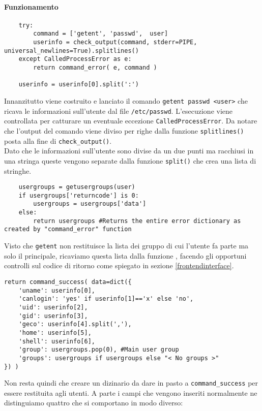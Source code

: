 \documentclass[11pt]{article}
\begin{document}
\paragraph{Funzionamento}
\begin{lstlisting}
    try:
        command = ['getent', 'passwd',  user]
        userinfo = check_output(command, stderr=PIPE, universal_newlines=True).splitlines()
    except CalledProcessError as e:
        return command_error( e, command )

	userinfo = userinfo[0].split(':')
\end{lstlisting}
Innanzitutto viene costruito e lanciato il comando \texttt{getent passwd <user>} che ricava le informazioni sull'utente dal file \texttt{/etc/passwd}.
L'esecuzione viene controllata per catturare un eventuale eccezione \texttt{CalledProcessError}. Da notare che l'output del comando viene diviso per righe
dalla funzione \texttt{splitlines()} posta alla fine di \texttt{check\_output()}.\\
Dato che le informazioni sull'utente sono divise da un due punti ma racchiusi in una stringa queste vengono separate dalla funzione \texttt{split()}
che crea una lista di stringhe.
\begin{lstlisting}
    usergroups = getusergroups(user)
    if usergroups['returncode'] is 0:
        usergroups = usergroups['data']
    else:
        return usergroups #Returns the entire error dictionary as created by "command_error" function
\end{lstlisting}
Visto che \texttt{getent} non restituisce la lista dei gruppo di cui l'utente fa parte ma solo il principale, ricaviamo questa lista
dalla funzione , facendo gli opportuni controlli sul codice di ritorno come spiegato in sezione \ref{frontendinterface}.
\begin{lstlisting}
return command_success( data=dict({
	'uname': userinfo[0],
	'canlogin': 'yes' if userinfo[1]=='x' else 'no',
	'uid': userinfo[2],
	'gid': userinfo[3],
	'geco': userinfo[4].split(','),
	'home': userinfo[5],
	'shell': userinfo[6],
	'group': usergroups.pop(0), #Main user group
	'groups': usergroups if usergroups else "< No groups >"
}) )
\end{lstlisting}
Non resta quindi che creare un dizinario da dare in pasto a \texttt{command\_success} per essere restituita agli utenti.
A parte i campi che vengono inseriti normalmente ne distinguiamo quattro che si comportano in modo diverso:
\end{document}
